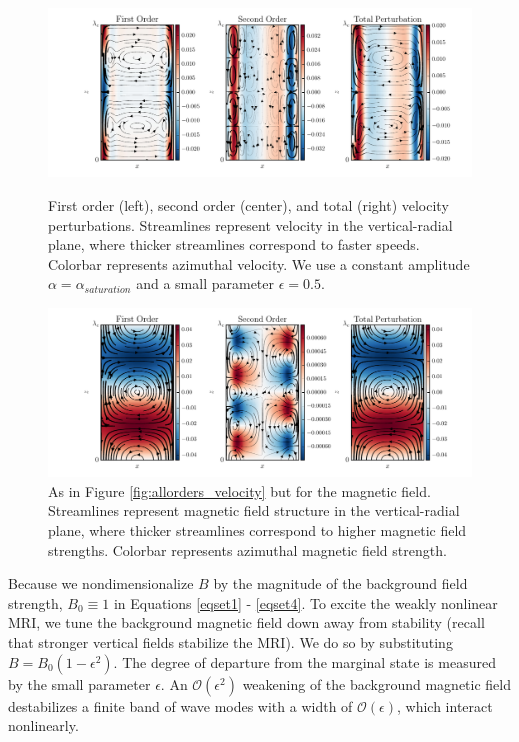 \documentclass{emulateapj}
\begin{document}
\begin{figure}
\centering
\includegraphics[width=\textwidth]{thingap_streamfuncs_velocity_Pm_1E-3-eps-converted-to.pdf}
\caption{First order (left), second order (center), and total (right) velocity perturbations. Streamlines represent velocity in the vertical-radial plane, where thicker streamlines correspond to faster speeds. Colorbar represents azimuthal velocity. We use a constant amplitude $\alpha = \alpha_{saturation}$ and a small parameter $\epsilon = 0.5$.}\label{fig:allorders_velocity}
\vspace*{\floatsep}
\centering
\includegraphics[width=\textwidth]{thingap_streamfuncs_Bfield_Pm_1E-3-eps-converted-to.pdf}
\caption{As in Figure \ref{fig:allorders_velocity} but for the magnetic field. Streamlines represent magnetic field structure in the vertical-radial plane, where thicker streamlines correspond to higher magnetic field strengths. Colorbar represents azimuthal magnetic field strength.}\label{fig:allorders_Bfield}
\end{figure}

Because we nondimensionalize $B$ by the magnitude of the background field strength, $B_0 \equiv 1$ in Equations \ref{eqset1} - \ref{eqset4}. To excite the weakly nonlinear MRI, we tune the background magnetic field down away from stability (recall that stronger vertical fields stabilize the MRI). We do so by substituting $B = B_0\left(1 - \epsilon^2\right)$. The degree of departure from the marginal state is measured by the small parameter $\epsilon$. An $\mathcal{O}\left(\epsilon^2\right)$ weakening of the background magnetic field destabilizes a finite band of wave modes with a width of $\mathcal{O}\left(\epsilon\right)$, which interact nonlinearly.
\end{document}
